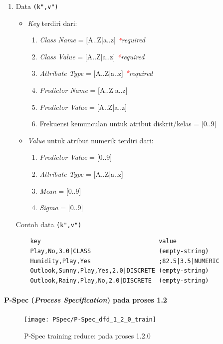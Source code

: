 \begin{enumerate}
	\item{Data \verb|(k",v")|}
	\begin{itemize}
		\item \textit{Key} terdiri dari:
		\begin{enumerate}
			\item \textit{Class Name} = [A..Z|a..z] \textit{\textcolor{red}{*}required}
			\item \textit{Class Value} = [A..Z|a..z] \textit{\textcolor{red}{*}required}
			\item \textit{Attribute Type} = [A..Z|a..z]	\textit{\textcolor{red}{*}required}	
			\item \textit{Predictor Name} = [A..Z|a..z]	
			\item \textit{Predictor Value} = [A..Z|a..z]
			\item Frekuensi kemunculan untuk atribut diskrit/kelas = [0..9]
		\end{enumerate}
				
		\item \textit{Value} untuk atribut numerik terdiri dari:
		\begin{enumerate}
			\item \textit{Predictor Value} = [0..9] 
			\item \textit{Attribute Type} = [A..Z|a..z] 			
			\item \textit{Mean} = [0..9]
			\item \textit{Sigma} = [0..9]
		\end{enumerate}
	\end{itemize}
	Contoh data \verb|(k",v")|
	\begin{lstlisting}
	key									value
	Play,No,3.0|CLASS					(empty-string)
	Humidity,Play,Yes 					;82.5|3.5|NUMERIC
	Outlook,Sunny,Play,Yes,2.0|DISCRETE	(empty-string)
	Outlook,Rainy,Play,No,2.0|DISCRETE	(empty-string)
	\end{lstlisting}


\end{enumerate}


\paragraph{P-Spec (\textit{Process Specification}) pada proses 1.2}

\begin{figure}[H]
	\centering
	\texttt{[image: PSpec/P-Spec\_dfd\_1\_2\_0\_train]}
	\caption[P-Spec training reduce: pada proses 1.2.0]{P-Spec training reduce: pada proses 1.2.0}
	\label{fig:P-Spec training reduce: pada proses 1.2.0}
\end{figure}

